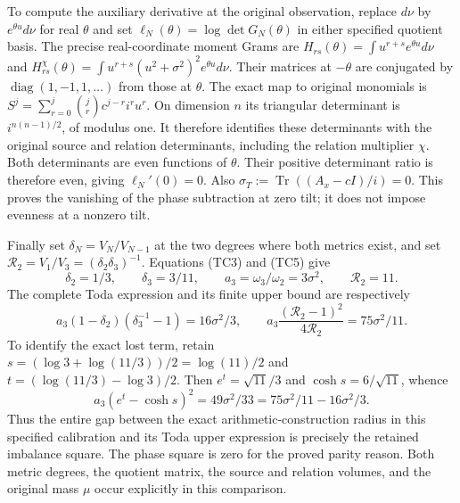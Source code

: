 To compute the auxiliary derivative at the original observation, replace
$d\nu$ by $e^{\theta u}d\nu$ for real $\theta$ and set
$\ell_N(\theta)=\log\det G_N(\theta)$ in either specified quotient basis.
The precise real-coordinate moment Grams are
$H_{rs}(\theta)=\int u^{r+s}e^{\theta u}d\nu$ and
$H^\chi_{rs}(\theta)=\int u^{r+s}(u^2+\sigma^2)^2e^{\theta u}d\nu$.
Their matrices at $-\theta$ are conjugated by
$\operatorname{diag}(1,-1,1,\ldots)$ from those at $\theta$.
The exact map to original monomials is
$S^j=\sum_{r=0}^j\binom jr c^{j-r}i^ru^r$.
On dimension $n$ its triangular determinant is $i^{n(n-1)/2}$,
of modulus one. It therefore identifies these determinants with the
original source and relation determinants, including the relation
multiplier $\chi$. Both determinants are even functions of $\theta$.
Their positive determinant ratio is therefore even, giving
$\ell_N'(0)=0$. Also
$\sigma_T:=\operatorname{Tr}((A_x-cI)/i)=0$.
This proves the vanishing of the phase subtraction at zero tilt; it
does not impose evenness at a nonzero tilt.

Finally set $\delta_N=V_N/V_{N-1}$ at the two degrees where both
metrics exist, and set $\mathcal R_2=V_1/V_3=(\delta_2\delta_3)^{-1}$.
Equations (TC3) and (TC5) give
\[
 \delta_2=1/3,\qquad \delta_3=3/11,\qquad
 a_3=\omega_3/\omega_2=3\sigma^2,\qquad \mathcal R_2=11.
 \tag{TC8}
\]
The complete Toda expression and its finite upper bound are respectively
\[
 a_3(1-\delta_2)(\delta_3^{-1}-1)=16\sigma^2/3,
 \qquad a_3\frac{(\mathcal R_2-1)^2}{4\mathcal R_2}
       =75\sigma^2/11.
 \tag{TC9}
\]
To identify the exact lost term, retain
$s=(\log3+\log(11/3))/2=\log(11)/2$ and
$t=(\log(11/3)-\log3)/2$. Then
$e^t=\sqrt{11}/3$ and $\cosh s=6/\sqrt{11}$, whence
\[
 a_3(e^t-\cosh s)^2=49\sigma^2/33
       =75\sigma^2/11-16\sigma^2/3.
 \tag{TC10}
\]
Thus the entire gap between the exact arithmetic-construction radius in
this specified calibration and its Toda upper expression is precisely
the retained imbalance square. The phase square is zero for the proved
parity reason. Both metric degrees, the quotient matrix, the source and
relation volumes, and the original mass $\mu$ occur explicitly in this
comparison.

